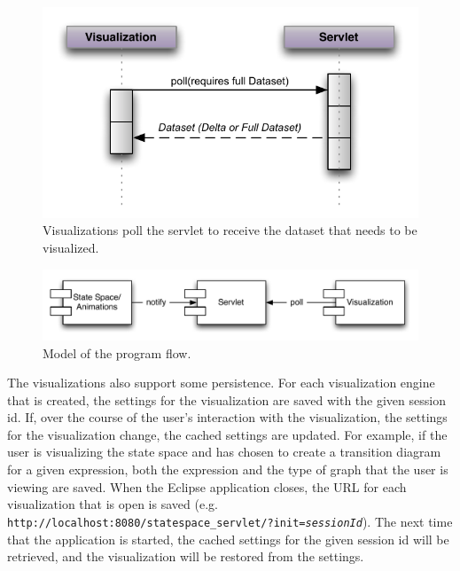 \begin{center}
\begin{figure}[h!]
\centering
\includegraphics[width=14cm]{bilder/communication.pdf}
\caption{Visualizations poll the servlet to receive the dataset that needs to be visualized.}
\label{communication}
\end{figure}
\end{center}

\begin{center}
\begin{figure}[h!]
\centering
\includegraphics[width=14cm]{bilder/programFlow.pdf}
\caption{Model of the program flow.}
\label{programFlow}
\end{figure}
\end{center}

The visualizations also support some persistence. For each visualization engine that is created, the settings for the visualization are saved with the given session id. If, over the course of the user's interaction with the visualization, the settings for the visualization change, the cached settings are updated. For example, if the user is visualizing the state space and has chosen to create a transition diagram for a given expression, both the expression and the type of graph that the user is viewing are saved. When the Eclipse application closes, the URL for each visualization that is open is saved (e.g. \texttt{http://localhost:8080/statespace\_servlet/?init=\emph{sessionId}}). The next time that the application is started, the cached settings for the given session id will be retrieved, and the visualization will be restored from the settings.

